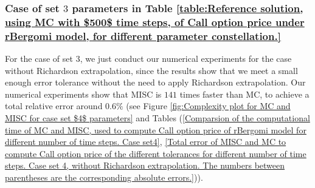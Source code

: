 \FloatBarrier
\subsubsection{Case of set $3$ parameters in Table \ref{table:Reference solution, using MC with $500$ time steps, of Call option price under rBergomi model, for different parameter constellation.}}\label{sec:Case of set 4 parameters}


For the case of set $3$, we just conduct our numerical experiments for the case without Richardson extrapolation, since the results show that we meet a small enough error tolerance without the need to apply   Richardson extrapolation.  Our numerical experiments show that MISC is  $141$ times faster than MC, to achieve a total relative error around $0.6\%$ (see Figure \ref{fig:Complexity plot for MC and MISC for case set $4$ parameters} and Tables (\ref{Comparsion of the computational time of  MC and MISC, used to compute Call option price of rBergomi model for different number of time steps. Case set4}, \ref{Total error of MISC and MC to compute Call option price of the different tolerances for different number of time steps. Case set 4, without Richardson extrapolation. The numbers between parentheses are the corresponding absolute errors.})).

